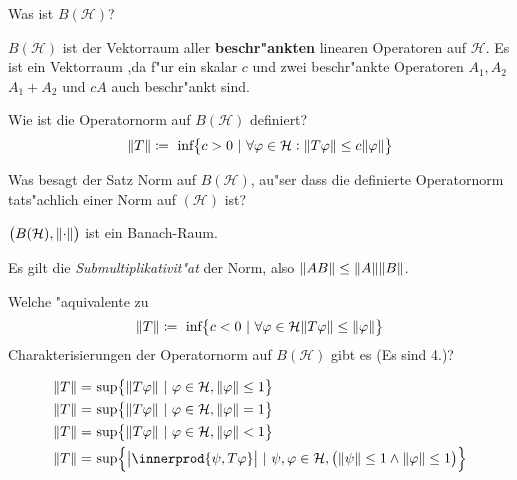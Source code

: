 \documentclass[9pt]{article}
\DeclarePairedDelimiter{\innerprod}\langle\rangle
\newcommand{\Hi}{\mathcal{H}}
\newenvironment{field}{}{\newpage}
\newif\ifnote
\newenvironment{note}{\notetrue}{\notefalse}
\newcommand{\localtag}{}
\newcommand{\globaltag}{}
\newcommand{\uuid}{}
\newcommand{\tags}[1]{
    \ifnote 
        \renewcommand{\localtag}{#1}
    \else
        \renewcommand{\globaltag}{#1}
    \fi 
    }
\newcommand{\xplain}[1]{\renewcommand{\uuid}{#1}}
\begin{document}
	\begin{note}
		\xplain{62c8419e-280e-458d-bd7f-fe2a0f0f0ddd}
		\tags{6.1.5, 6.1.6, 6.1.7, operatornorm}
		
		\begin{field}  %
			Was ist $B(\Hi)$? 
		\end{field}
		
		\begin{field}  %
			$B(\Hi)$ ist der Vektorraum aller \textbf{beschr"ankten} linearen Operatoren auf $\Hi$.
			Es ist ein Vektorraum ,da f"ur ein skalar $c$ und zwei beschr"ankte Operatoren $A_1, A_2$
			$A_1 + A_2$ und $cA$ auch beschr"ankt sind. 
		\end{field}
		
			
		\begin{field}  %
			Wie ist die Operatornorm auf $B(\Hi)$ definiert? 
		\end{field}
		\begin{field}  %
			\begin{equation*}
				\norm{T} \coloneqq \ \text{inf}\qty{c>0 \ | \ \forall \varphi \in \Hi: \norm{T\varphi} \leq c\norm{\varphi}}
			\end{equation*}
		\end{field}
			
		\begin{field}  %
			Was besagt der Satz Norm auf $B(\Hi)$, au"ser dass die definierte Operatornorm tats"achlich einer Norm auf $(\Hi)$ ist? 
		\end{field}
		
		\begin{field}  %
			$\qty(B(\Hi), \norm{\cdot})$ ist ein Banach-Raum.
			
			Es gilt die \textit{Submultiplikativit"at} der Norm, also $\norm{AB} \leq \norm{A}\norm{B}$.
		\end{field}
			
		\begin{field}  %
			Welche "aquivalente zu 
			\begin{equation*}
			\norm{T} \coloneqq \ \text{inf}\qty{c <0 \ | \ \forall \varphi \in \Hi
			\norm{T\varphi} \leq \norm{\varphi}}
			\end{equation*}
		 Charakterisierungen der Operatornorm auf $B(\Hi)$ gibt es (Es sind 4.)?
		\end{field}
		
		\begin{field}  %
			\begin{align*}
				\norm{T} =& \ \text{sup}\qty{\norm{T\varphi} \ | \ \varphi \in \Hi, \norm{\varphi} \leq 1} \\
				\norm{T} =& \ \text{sup}\qty{\norm{T\varphi} \ | \ \varphi \in \Hi, \norm{\varphi} = 1} \\
				\norm{T} =& \ \text{sup}\qty{\norm{T\varphi} \ | \ \varphi \in \Hi, \norm{\varphi} < 1} \\
				\norm{T} =& \ \text{sup}\qty{\abs{\innerprod{\psi, T\varphi}} \ | \ \psi, \varphi \in \Hi, \qty(\norm{\psi} \leq 1 \wedge \norm{\varphi} \leq 1)} \\
			\end{align*}
		\end{field}
	\end{note}
\end{document}
